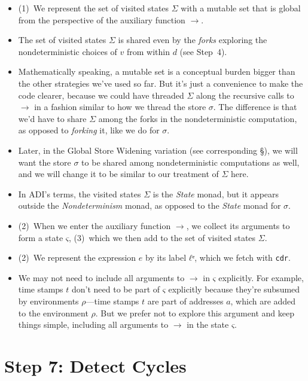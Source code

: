 \documentclass[12pt, oneside]{book}
\begin{document}
\begin{itemize}
  \item (1)~We represent the set of visited states \(Σ\) with a mutable set that is global from the perspective of the auxiliary function \(→\).
  \item The set of visited states \(Σ\) is shared even by the \emph{forks} exploring the nondeterministic choices of \(v\) from within \(d\) (see Step~4).
  \item Mathematically speaking, a mutable set is a conceptual burden bigger than the other strategies we’ve used so far. But it’s just a convenience to make the code clearer, because we could have threaded \(Σ\) along the recursive calls to \(→\) in a fashion similar to how we thread the store \(σ\). The difference is that we’d have to share \(Σ\) among the forks in the nondeterministic computation, as opposed to \emph{forking} it, like we do for \(σ\).
  \item Later, in the Global Store Widening variation (see corresponding §), we will want the store \(σ\) to be shared among nondeterministic computations as well, and we will change it to be similar to our treatment of \(Σ\) here.
  \item In ADI’s terms, the visited states \(Σ\) is the \emph{State} monad, but it appears outside the \emph{Nondeterminism} monad, as opposed to the \emph{State} monad for \(σ\).
  \item (2)~When we enter the auxiliary function \(→\), we collect its arguments to form a state \(ς\), (3)~which we then add to the set of visited states \(Σ\).
  \item (2)~We represent the expression \(e\) by its label \(ℓᵉ\), which we fetch with \texttt{cdr}.
  \item We may not need to include all arguments to \(→\) in \(ς\) explicitly. For example, time stamps \(t\) don’t need to be part of \(ς\) explicitly because they’re subsumed by environments \(ρ\)—time stamps \(t\) are part of addresses \(a\), which are added to the environment \(ρ\). But we prefer not to explore this argument and keep things simple, including all arguments to \(→\) in the state \(ς\).
\end{itemize}

\section{Step 7: Detect Cycles}
\end{document}
